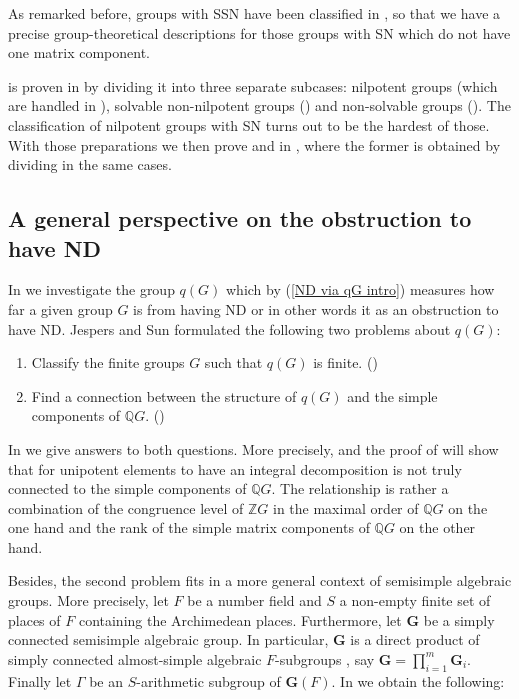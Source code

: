 \documentclass[a4paper,10pt]{amsart}
\theoremstyle{definition}
\theoremstyle{remark}
\newcommand{\Z}{{\mathbb Z}}
\newcommand{\Q}{{\mathbb Q}}
\begin{document}
As remarked before, groups with SSN have been classified in \cite{LiuPassman16}, so that we have a precise group-theoretical descriptions for those groups with SN which do not have one matrix component.   

 is proven in  by dividing it into three separate subcases: nilpotent groups (which are handled in  ), solvable non-nilpotent groups () and non-solvable groups (). The classification of nilpotent groups with SN turns out to be the hardest of those.  With those preparations we then prove  and  in , where the former is obtained by dividing in the same cases. 

\subsection*{A general perspective on the obstruction to have ND}
In  we investigate the group $q(G)$ which by (\ref{ND via qG intro}) measures how far a given group $G$ is from having ND or in other words it as an obstruction to have ND. Jespers and Sun \cite[Section 6]{JespersSun} formulated the following two problems about $q(G)$: 

\begin{enumerate}
\item Classify the finite groups $G$ such that $q(G)$ is finite. (\cite[Problem 1, §6]{JespersSun})
\item Find a connection between the structure of $q(G)$ and the simple components of $\Q G$. (\cite[Problem 2, §6]{JespersSun})
\end{enumerate}

In  we give answers to both questions. More precisely,  and the proof of  will show that for unipotent elements to have an integral decomposition is not truly connected to the simple components of $\Q G$. The relationship is rather a combination of the congruence level of $\Z G$ in the maximal order of $\Q G$ on the one hand and the rank of the simple matrix components of $\Q G$ on the other hand.

Besides, the second problem fits in a more general context of semisimple algebraic groups. More precisely,  let $F$ be a number field and $S$ a non-empty finite set of places of $F$ containing the Archimedean places. Furthermore, let $\mathbf{G}$ be a simply connected semisimple algebraic group. In particular, $\mathbf{G}$ is a direct product of simply connected almost-simple algebraic $F$-subgroups \cite[Theorem 2.6]{PlaRapBook}, say $\mathbf{G} = \prod_{i=1}^m \mathbf{G}_i$. Finally let $\Gamma$ be an $S$-arithmetic subgroup of $\mathbf{G}(F)$. In  we obtain the following:
\end{document}
